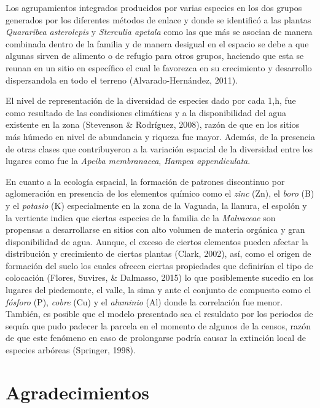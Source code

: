 \documentclass[11pt,]{article}
\begin{document}
Los agrupamientos integrados producidos por varias especies en los dos
grupos generados por los diferentes métodos de enlace y donde se
identificó a las plantas \emph{Quararibea asterolepis} y \emph{Sterculia
apetala} como las que más se asocian de manera combinada dentro de la
familia y de manera desigual en el espacio se debe a que algunas sirven
de alimento o de refugio para otros grupos, haciendo que esta se reunan
en un sitio en específico el cual le favorezca en su crecimiento y
desarrollo dispersandola en todo el terreno (Alvarado-Hernández, 2011).

El nivel de representación de la diversidad de especies dado por cada
1,h, fue como resultado de las condisiones climáticas y a la
disponibilidad del agua existente en la zona (Stevenson \& Rodríguez,
2008), razón de que en los sitios más húmedo en nivel de abundancia y
riqueza fue mayor. Además, de la presencia de otras clases que
contribuyeron a la variación espacial de la diversidad entre los lugares
como fue la \emph{Apeiba membranacea}, \emph{Hampea appendiculata}.

En cuanto a la ecología espacial, la formación de patrones discontinuo
por aglomeración en presencia de los elementos químico como el
\emph{zinc} (Zn), el \emph{boro} (B) y el \emph{potasio} (K)
especialmente en la zona de la Vaguada, la llanura, el espolón y la
vertiente indica que ciertas especies de la familia de la
\emph{Malvaceae} son propensas a desarrollarse en sitios con alto
volumen de materia orgánica y gran disponibilidad de agua. Aunque, el
exceso de ciertos elementos pueden afectar la distribución y crecimiento
de ciertas plantas (Clark, 2002), así, como el origen de formación del
suelo los cuales ofrecen ciertas propiedades que definirían el tipo de
colocación (Flores, Suvires, \& Dalmasso, 2015) lo que posiblemente
sucedio en los lugares del piedemonte, el valle, la sima y ante el
conjunto de compuesto como el \emph{fósforo} (P), \emph{cobre} (Cu) y el
\emph{aluminio} (Al) donde la correlación fue menor. También, es posible
que el modelo presentado sea el resuldato por los periodos de sequía que
pudo padecer la parcela en el momento de algunos de la censos, razón de
que este fenómeno en caso de prolongarse podría causar la extinción
local de especies arbóreas (Springer, 1998).

\section{Agradecimientos}\label{agradecimientos}
\end{document}

